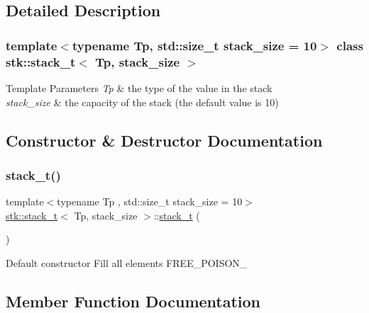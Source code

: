 \subsection{Detailed Description}
\subsubsection*{template$<$typename Tp, std\+::size\+\_\+t stack\+\_\+size = 10$>$\newline
class stk\+::stack\+\_\+t$<$ Tp, stack\+\_\+size $>$}


\begin{DoxyTemplParams}{Template Parameters}
{\em Tp} & the type of the value in the stack \\
\hline
{\em stack\+\_\+size} & the capacity of the stack (the default value is 10) \\
\hline
\end{DoxyTemplParams}


\subsection{Constructor \& Destructor Documentation}
\mbox{\label{classstk_1_1stack__t_ab7605ffb3efbfdaf23c1411dba8076d7}} 
\subsubsection{\texorpdfstring{stack\+\_\+t()}{stack\_t()}}
{\footnotesize\ttfamily template$<$typename Tp , std\+::size\+\_\+t stack\+\_\+size = 10$>$ \\
\hyperlink{classstk_1_1stack__t}{stk\+::stack\+\_\+t}$<$ Tp, stack\+\_\+size $>$\+::\hyperlink{classstk_1_1stack__t}{stack\+\_\+t} (\begin{DoxyParamCaption}{ }\end{DoxyParamCaption})\hspace{0.3cm}{\ttfamily [inline]}}

Default constructor Fill all elements F\+R\+E\+E\+\_\+\+P\+O\+I\+S\+O\+N\+\_\+ 

\subsection{Member Function Documentation}
\mbox{\label{classstk_1_1stack__t_ac6b1f910422f3402f4ffcc8d496d0273}} 
